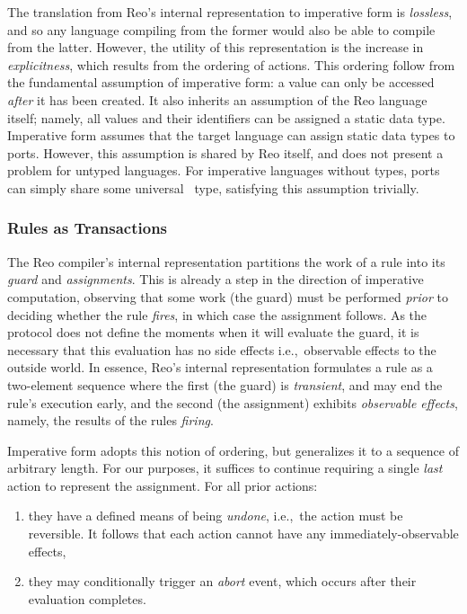 The translation from Reo's internal representation to imperative form is \textit{lossless}, and so any language compiling from the former would also be able to compile from the latter. However, the utility of this representation is the increase in \textit{explicitness}, which results from the ordering of actions. This ordering follow from the fundamental assumption of imperative form: a value can only be accessed \textit{after} it has been created. It also inherits an assumption of the Reo language itself; namely, all values and their identifiers can be assigned a static data type. Imperative form assumes that the target language can assign static data types to ports. However, this assumption is shared by Reo itself, and does not present a problem for untyped languages. For imperative languages without types, ports can simply share some universal~ type, satisfying this assumption trivially.

\subsubsection{Rules as Transactions}

The Reo compiler's internal representation partitions the work of a rule into its \textit{guard} and \textit{assignments}. This is already a step in the direction of imperative computation, observing that some work (the guard) must be performed \textit{prior} to deciding whether the rule \textit{fires}, in which case the assignment follows. As the protocol does not define the moments when it will evaluate the guard, it is necessary that this evaluation has no side effects i.e.,\ observable effects to the outside world. In essence, Reo's internal representation formulates a rule as a two-element sequence where the first (the guard) is \textit{transient}, and may end the rule's execution early, and the second (the assignment) exhibits \textit{observable effects}, namely, the results of the rules \textit{firing}.

Imperative form adopts this notion of ordering, but generalizes it to a sequence of arbitrary length. For our purposes, it suffices to continue requiring a single \textit{last} action to represent the assignment. For all prior actions:
\begin{enumerate}
	\item they have a defined means of being \textit{undone}, i.e.,\ the action must be reversible. It follows that each action cannot have any immediately-observable effects,
	\item they may conditionally trigger an \textit{abort} event, which occurs after their evaluation completes.
\end{enumerate}

